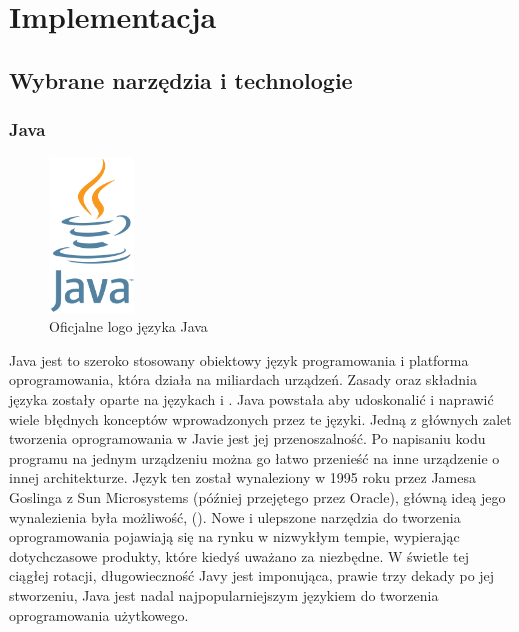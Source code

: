 \chapter{Implementacja}
\section{Wybrane narzędzia i technologie}
\subsection{Java}

\begin{figure}[!htbp]
    \centering
    \includegraphics[width=0.2\textwidth]{images/javaLogo.png}
    \caption{Oficjalne logo języka Java}
    \label{fig:enter-label}
\end{figure}


Java jest to szeroko stosowany obiektowy język programowania i platforma oprogramowania, która działa na miliardach urządzeń. Zasady oraz składnia języka zostały oparte na językach  i . Java powstała aby udoskonalić i naprawić wiele błędnych konceptów wprowadzonych przez te języki. Jedną z głównych zalet tworzenia oprogramowania w Javie jest jej przenoszalność. Po napisaniu kodu programu na jednym urządzeniu można go łatwo przenieść na inne urządzenie o innej architekturze. Język ten został wynaleziony w 1995 roku przez Jamesa Goslinga z Sun Microsystems (później przejętego przez Oracle), główną ideą jego wynalezienia była możliwość,   (). Nowe i ulepszone narzędzia do tworzenia oprogramowania pojawiają się na rynku w nizwykłym tempie, wypierając dotychczasowe produkty, które kiedyś uważano za niezbędne. W świetle tej ciągłej rotacji, długowieczność Javy jest imponująca, prawie trzy dekady po jej stworzeniu, Java jest nadal najpopularniejszym językiem do tworzenia oprogramowania użytkowego\cite{javaIBM}\cite{javaDEV}.

